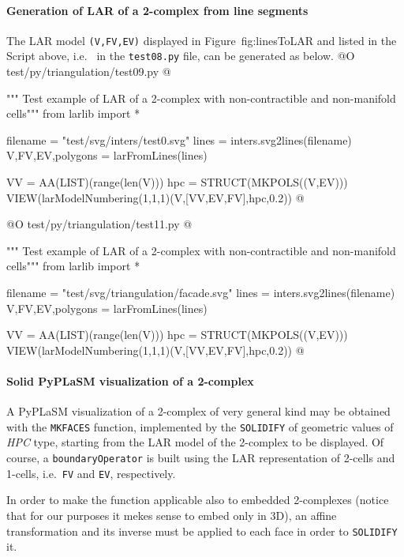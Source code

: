 \documentclass[11pt,oneside]{article}    %
\begin{document}
\paragraph{Generation of LAR of a 2-complex from line segments}
The LAR model \texttt{(V,FV,EV)} displayed in Figure~fig:linesToLAR and listed in the Script above, 
i.e.~ in the \texttt{test08.py} file, can be generated as below.
@O test/py/triangulation/test09.py
@{""" Test example of LAR of a 2-complex with non-contractible and non-manifold cells"""
from larlib import *

filename = "test/svg/inters/test0.svg"
lines = inters.svg2lines(filename)
V,FV,EV,polygons = larFromLines(lines)

VV = AA(LIST)(range(len(V)))
hpc = STRUCT(MKPOLS((V,EV)))        
VIEW(larModelNumbering(1,1,1)(V,[VV,EV,FV],hpc,0.2)) 
@}

@O test/py/triangulation/test11.py
@{""" Test example of LAR of a 2-complex with non-contractible and non-manifold cells"""
from larlib import *

filename = "test/svg/triangulation/facade.svg"
lines = inters.svg2lines(filename)
V,FV,EV,polygons = larFromLines(lines)

VV = AA(LIST)(range(len(V)))
hpc = STRUCT(MKPOLS((V,EV)))        
VIEW(larModelNumbering(1,1,1)(V,[VV,EV,FV],hpc,0.2)) 
@}


\paragraph{Solid PyPLaSM visualization of a 2-complex}

A PyPLaSM visualization of a 2-complex of very general kind may be obtained with the \texttt{MKFACES} function, implemented by the \texttt{SOLIDIFY} of geometric values of \emph{HPC} type, starting from the LAR model of the 2-complex to be displayed. Of course, a \texttt{boundaryOperator} is built using the LAR representation of 2-cells and 1-cells, i.e.~\texttt{FV} and \texttt{EV}, respectively.

In order to make the function applicable also to embedded 2-complexes (notice that for our purposes it mekes sense to embed only in 3D), an affine transformation and its inverse must be applied to each face in order to \texttt{SOLIDIFY} it.
\end{document}
